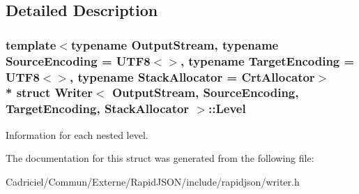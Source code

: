 \subsection{Detailed Description}
\subsubsection*{template$<$typename Output\+Stream, typename Source\+Encoding = U\+T\+F8$<$$>$, typename Target\+Encoding = U\+T\+F8$<$$>$, typename Stack\+Allocator = Crt\+Allocator$>$\\*
struct Writer$<$ Output\+Stream, Source\+Encoding, Target\+Encoding, Stack\+Allocator $>$\+::\+Level}

Information for each nested level. 

The documentation for this struct was generated from the following file\+:\begin{DoxyCompactItemize}
\item 
Cadriciel/\+Commun/\+Externe/\+Rapid\+J\+S\+O\+N/include/rapidjson/writer.\+h\end{DoxyCompactItemize}
